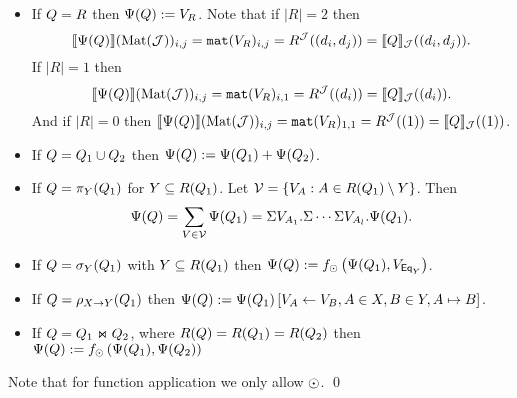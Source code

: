 \begin{itemize}
  \item If $Q = R$ then $\Psi (Q):=V_R$. Note that if $|R|=2$ then 
    $$\llbracket \Psi(Q) \rrbracket(\text{Mat}(\mathcal{J}))_{i,j}=\texttt{mat}(V_R)_{i,j} = R^{\mathcal{J}}((d_i, d_j))=\llbracket Q \rrbracket_{\mathcal{J}}((d_i, d_j)).$$ 
    If $|R|=1$ then 
    $$\llbracket \Psi(Q) \rrbracket(\text{Mat}(\mathcal{J}))_{i,j}=\texttt{mat}(V_R)_{i,1} = R^{\mathcal{J}}((d_i))=\llbracket Q \rrbracket_{\mathcal{J}}((d_i)).$$
    And if $|R|=0$ then 
    $\llbracket \Psi(Q) \rrbracket(\text{Mat}(\mathcal{J}))_{i,j}=\texttt{mat}(V_R)_{1,1} = R^{\mathcal{J}}((1))=\llbracket Q \rrbracket_{\mathcal{J}}((1))$.
  \item If $Q=Q_1\cup Q_2$ then $\Psi(Q):=\Psi(Q_1)+\Psi(Q_2)$.
  \item If $Q = \pi_{Y}(Q_1)$ for $Y\subseteq R(Q_1)$. Let $\mathcal{V} = \lbrace V_A:A\in R(Q_1)\setminus Y \rbrace$. 
    Then
    $$
    \Psi(Q) = \sum_{V\in\mathcal{V}} \Psi(Q_1) = \Sigma V_{A_1}. \Sigma \cdots \Sigma V_{A_{l}}. \Psi(Q_1).
    $$
  \item If $Q = \sigma_Y(Q_1)$ with $Y\subseteq R(Q_1)$ then 
    $\Psi(Q):=f_{\odot}\left( \Psi(Q_1), V_{\mathsf{Eq}_Y} \right)$.
  \item If $Q = \rho_{X\rightarrow Y}(Q_1)$ then $\Psi (Q):= \Psi (Q_1)\left[ V_A\gets V_B, A\in X, B\in Y, A \mapsto B \right]$.
  \item If $Q = Q_1\Join Q_2$, where $R(Q)=R(Q_1)=R(Q_2)$ then 
    $\Psi (Q):=f_{\odot}\left( \Psi (Q_1), \Psi (Q_2) \right)$
\end{itemize}

Note that for function application we only allow $\odot$.
\qed